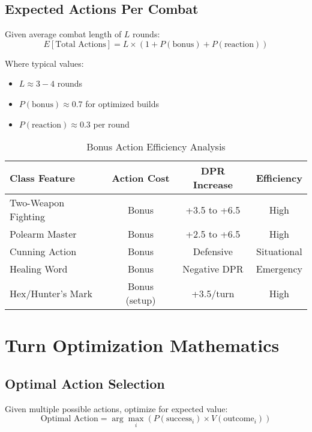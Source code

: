\documentclass[11pt,letterpaper,openany]{book}
\begin{document}
\subsection{Expected Actions Per Combat}

Given average combat length of $L$ rounds:
\begin{equation}
E[\text{Total Actions}] = L \times (1 + P(\text{bonus}) + P(\text{reaction}))
\end{equation}

Where typical values:
\begin{itemize}
    \item $L \approx 3-4$ rounds
    \item $P(\text{bonus}) \approx 0.7$ for optimized builds
    \item $P(\text{reaction}) \approx 0.3$ per round
\end{itemize}

\begin{table}[h]
\centering
\begin{tabular}{@{}lccc@{}}
\toprule
\textbf{Class Feature} & \textbf{Action Cost} & \textbf{DPR Increase} & \textbf{Efficiency} \\
\midrule
Two-Weapon Fighting & Bonus & +3.5 to +6.5 & High \\
Polearm Master & Bonus & +2.5 to +6.5 & High \\
Cunning Action & Bonus & Defensive & Situational \\
Healing Word & Bonus & Negative DPR & Emergency \\
Hex/Hunter's Mark & Bonus (setup) & +3.5/turn & High \\
\bottomrule
\end{tabular}
\caption{Bonus Action Efficiency Analysis}
\end{table}

\section{Turn Optimization Mathematics}

\subsection{Optimal Action Selection}

Given multiple possible actions, optimize for expected value:
\begin{equation}
\text{Optimal Action} = \arg\max_i \left( P(\text{success}_i) \times V(\text{outcome}_i) \right)
\end{equation}
\end{document}
